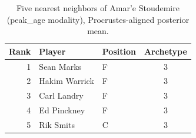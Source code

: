 \begin{table}[htbp]
  \centering\small
  \begin{tabular}{rllc}
    \toprule
    Rank & Player & Position & Archetype \\
    \midrule
    1 & Sean Marks & F & 3 \\
    2 & Hakim Warrick & F & 3 \\
    3 & Carl Landry & F & 3 \\
    4 & Ed Pinckney & F & 3 \\
    5 & Rik Smits & C & 3 \\
    \bottomrule
  \end{tabular}
  \caption{Five nearest neighbors of Amar'e Stoudemire (peak_age modality), Procrustes-aligned posterior mean.}
  \label{tab:Amar_e_Stoudemire_neighbors_peak_age}
\end{table}

